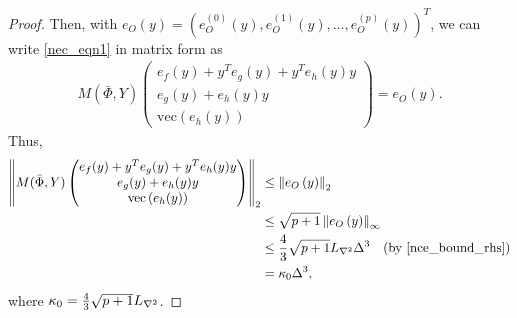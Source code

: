 \documentclass{article}
\newcommand{\matvec}{\mathrm{vec}}
\begin{document}
\begin{proof}
Then, with $e_O\left(y \right) = \left(
e^{(0)}_O\left(y\right),
e^{(1)}_O\left(y\right),
\ldots ,
e^{(p)}_O\left(y\right)
\right)^T$,
we can write \cref{nec_eqn1} in matrix form as 
\begin{align*}
M\left(\bar{\Phi}, Y\right)
\begin{pmatrix}
e_f(y) + y^Te_g(y) + y^Te_h(y) y \\
e_g(y) + e_h(y) y \\
\matvec\left(e_h(y)\right)
\end{pmatrix}
= e_O\left(y \right).
\end{align*}
Thus,
\begin{align}\label{err_bnd1}
\left\|M(\bar \Phi,Y)
\begin{pmatrix}
e_f(y) + y^Te_g(y) + y^Te_h(y) y \\
e_g(y) + e_h(y) y \\ 
\matvec\left(e_h(y)\right)
\end{pmatrix}\right\|_2
&\le \left\|e_O\left(y\right)\right\|_2 \\ \nonumber
&\le \sqrt{p+1} \left\|e_O\left(y\right)\right\|_{\infty} \\ \nonumber
&\le
\frac 4 3 \sqrt{p+1} L_{\nabla^2} \Delta^3 \quad \mbox{(by \cref{nce_bound_rhs})}\\ \nonumber
&= \kappa_0 \Delta^3,
\end{align}
where $\kappa_0 = \frac 4 3 \sqrt{p+1}{L_{\nabla^2}}$.


\end{proof}
\end{document}
